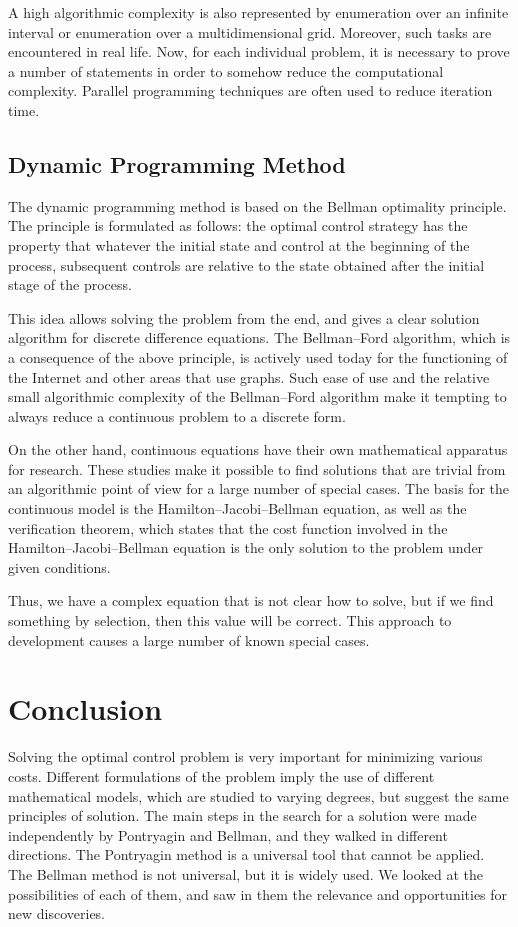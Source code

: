     A high algorithmic complexity is also represented by enumeration over an infinite interval or enumeration over a multidimensional grid.
    Moreover, such tasks are encountered in real life. Now, for each individual problem, it is necessary to prove a number of statements in order to somehow reduce the computational complexity.
    Parallel programming techniques are often used to reduce iteration time.

    \subsection{Dynamic Programming Method}
    The dynamic programming method is based on the Bellman optimality principle.
    The principle is formulated as follows: the optimal control strategy has the property that whatever the initial state and control at the beginning of the process, subsequent controls are relative to the state obtained after the initial stage of the process.

    This idea allows solving the problem from the end, and gives a clear solution algorithm for discrete difference equations.
    The Bellman--Ford algorithm, which is a consequence of the above principle, is actively used today for the functioning of the Internet and other areas that use graphs.
    Such ease of use and the relative small algorithmic complexity of the Bellman--Ford algorithm make it tempting to always reduce a continuous problem to a discrete form.

    On the other hand, continuous equations have their own mathematical apparatus for research.
    These studies make it possible to find solutions that are trivial from an algorithmic point of view for a large number of special cases.
    The basis for the continuous model is the Hamilton--Jacobi--Bellman equation, as well as the verification theorem, which states that the cost function involved in the Hamilton--Jacobi--Bellman equation is the only solution to the problem under given conditions.

    Thus, we have a complex equation that is not clear how to solve, but if we find something by selection, then this value will be correct.
    This approach to development causes a large number of known special cases.

    \section{Conclusion}
    Solving the optimal control problem is very important for minimizing various costs.
    Different formulations of the problem imply the use of different mathematical models, which are studied to varying degrees, but suggest the same principles of solution.
    The main steps in the search for a solution were made independently by Pontryagin and Bellman, and they walked in different directions. The Pontryagin method is a universal tool that cannot be applied.
    The Bellman method is not universal, but it is widely used.
    We looked at the possibilities of each of them, and saw in them the relevance and opportunities for new discoveries.
    
